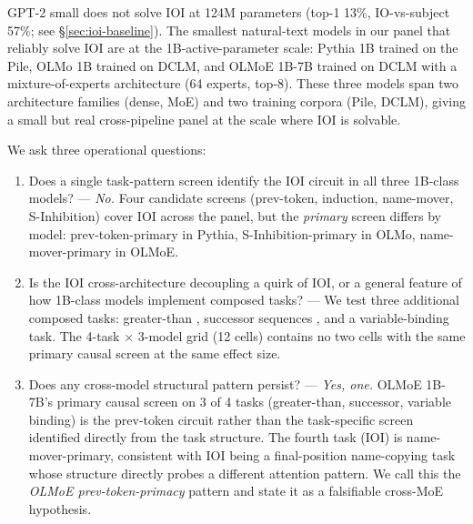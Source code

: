 \documentclass[11pt]{article}
\begin{document}
GPT-2 small does not solve IOI at 124M parameters (top-1 13\%, IO-vs-subject 57\%; see \S\ref{sec:ioi-baseline}). The smallest natural-text models in our panel that reliably solve IOI are at the 1B-active-parameter scale: Pythia 1B \citep{biderman2023pythia} trained on the Pile, OLMo 1B \citep{groeneveld2024olmo} trained on DCLM, and OLMoE 1B-7B \citep{muennighoff2024olmoe} trained on DCLM with a mixture-of-experts architecture (64 experts, top-8). These three models span two architecture families (dense, MoE) and two training corpora (Pile, DCLM), giving a small but real cross-pipeline panel at the scale where IOI is solvable.

We ask three operational questions:
\begin{enumerate}[topsep=2pt,itemsep=2pt]
\item Does a single task-pattern screen identify the IOI circuit in all three 1B-class models? --- \emph{No.} Four candidate screens (prev-token, induction, name-mover, S-Inhibition) cover IOI across the panel, but the \emph{primary} screen differs by model: prev-token-primary in Pythia, S-Inhibition-primary in OLMo, name-mover-primary in OLMoE.
\item Is the IOI cross-architecture decoupling a quirk of IOI, or a general feature of how 1B-class models implement composed tasks? --- We test three additional composed tasks: greater-than \citep{hanna2023greater}, successor sequences \citep{gould2023successor}, and a variable-binding task. The 4-task $\times$ 3-model grid (12 cells) contains no two cells with the same primary causal screen at the same effect size.
\item Does any cross-model structural pattern persist? --- \emph{Yes, one.} OLMoE 1B-7B's primary causal screen on 3 of 4 tasks (greater-than, successor, variable binding) is the prev-token circuit rather than the task-specific screen identified directly from the task structure. The fourth task (IOI) is name-mover-primary, consistent with IOI being a final-position name-copying task whose structure directly probes a different attention pattern. We call this the \emph{OLMoE prev-token-primacy} pattern and state it as a falsifiable cross-MoE hypothesis.
\end{enumerate}
\end{document}
